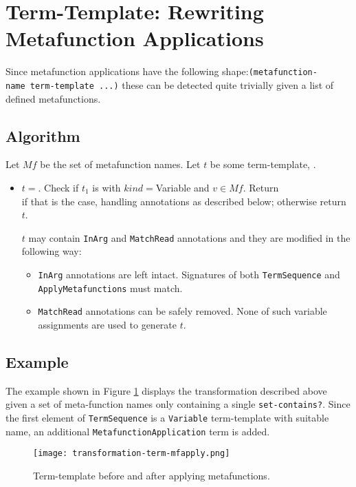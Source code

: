 \section{Term-Template: Rewriting Metafunction Applications}

Since metafunction applications have the following shape:\newline \texttt{(metafunction-name\ term-template\ ...)} these can be detected quite trivially given a list of defined metafunctions. 

\subsection{Algorithm}
Let $Mf$ be the set of metafunction names. Let $t$ be some term-template, . 
\begin{itemize}
\item $t=$\space \TermSequence. Check if $t_1$ is \TermLiteral\space with $kind=$\space Variable and $v \in Mf$. Return \\ \ApplyMetafunction[$v$][$t$][false] if that is the case, handling annotations as described below; otherwise return $t$. 

$t$ may contain \texttt{InArg} and \texttt{MatchRead} annotations and they are modified in the following way:
\begin{itemize}
\item
\texttt{InArg} annotations are left intact. Signatures of both \texttt{TermSequence} and \texttt{ApplyMetafunctions} must match.
\item
\texttt{MatchRead} annotations can be safely removed. None of such variable assignments are used to generate $t$.
\end{itemize}
\end{itemize}
\subsection{Example}
The example shown in Figure \ref{transformation-term-mfapply} displays the transformation described above given a set of meta-function names only containing a single \texttt{set-contains?}. Since the first element of \texttt{TermSequence} is a \texttt{Variable} term-template with suitable name, an additional \texttt{MetafunctionApplication} term is added.

\begin{figure}[htbp]
\texttt{[image: transformation-term-mfapply.png]}
\caption{Term-template before and after applying metafunctions.}
\label{transformation-term-mfapply}
\end{figure}
